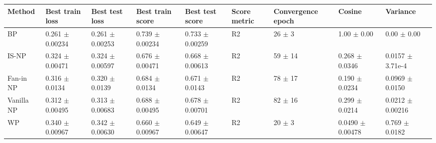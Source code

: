 \begin{tabular}{lllllllll}
\toprule
Method & Best train loss & Best test loss & Best train score & Best test score & Score metric & Convergence epoch & Cosine & Variance \\
\midrule
BP & 0.261 $\pm$ 0.00234 & 0.261 $\pm$ 0.00253 & 0.739 $\pm$ 0.00234 & 0.733 $\pm$ 0.00259 & R2 & 26 $\pm$ 3 & 1.00 $\pm$ 0.00 & 0.00 $\pm$ 0.00 \\
IS-NP & 0.324 $\pm$ 0.00471 & 0.324 $\pm$ 0.00597 & 0.676 $\pm$ 0.00471 & 0.668 $\pm$ 0.00613 & R2 & 59 $\pm$ 14 & 0.268 $\pm$ 0.0346 & 0.0157 $\pm$ 3.71e-4 \\
Fan-in NP & 0.316 $\pm$ 0.0134 & 0.320 $\pm$ 0.0139 & 0.684 $\pm$ 0.0134 & 0.671 $\pm$ 0.0143 & R2 & 78 $\pm$ 17 & 0.190 $\pm$ 0.0234 & 0.0969 $\pm$ 0.0150 \\
Vanilla NP & 0.312 $\pm$ 0.00495 & 0.313 $\pm$ 0.00683 & 0.688 $\pm$ 0.00495 & 0.678 $\pm$ 0.00701 & R2 & 82 $\pm$ 16 & 0.299 $\pm$ 0.0214 & 0.0212 $\pm$ 0.00216 \\
WP & 0.340 $\pm$ 0.00967 & 0.342 $\pm$ 0.00630 & 0.660 $\pm$ 0.00967 & 0.649 $\pm$ 0.00647 & R2 & 20 $\pm$ 3 & 0.0490 $\pm$ 0.00478 & 0.769 $\pm$ 0.0182 \\
\bottomrule
\end{tabular}
